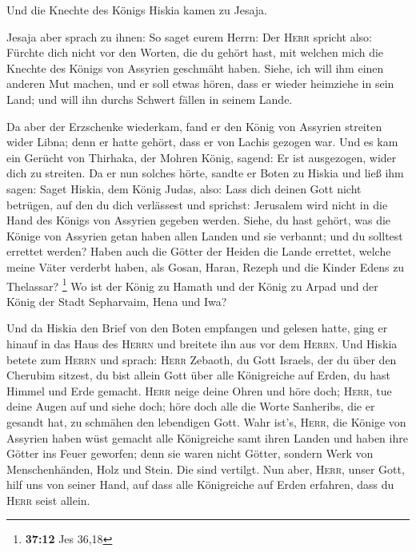  Und die Knechte des Königs Hiskia kamen zu Jesaja.

 Jesaja aber sprach zu ihnen: So saget eurem Herrn: Der
\textsc{Herr} spricht also: Fürchte dich nicht vor den Worten, die du
gehört hast, mit welchen mich die Knechte des Königs von Assyrien
geschmäht haben.  Siehe, ich will ihm einen anderen Mut
machen, und er soll etwas hören, dass er wieder heimziehe in sein Land;
und will ihn durchs Schwert fällen in seinem Lande.

 Da aber der Erzschenke wiederkam, fand er den König von
Assyrien streiten wider Libna; denn er hatte gehört, dass er von Lachis
gezogen war.  Und es kam ein Gerücht von Thirhaka, der
Mohren König, sagend: Er ist ausgezogen, wider dich zu streiten.
 Da er nun solches hörte, sandte er Boten zu Hiskia und
ließ ihm sagen: Saget Hiskia, dem König Judas, also: Lass dich deinen
Gott nicht betrügen, auf den du dich verlässest und sprichst: Jerusalem
wird nicht in die Hand des Königs von Assyrien gegeben werden.
 Siehe, du hast gehört, was die Könige von Assyrien getan
haben allen Landen und sie verbannt; und du solltest errettet werden?
 Haben auch die Götter der Heiden die Lande errettet,
welche meine Väter verderbt haben, als Gosan, Haran, Rezeph und die
Kinder Edens zu Thelassar? \footnote{\textbf{37:12} Jes 36,18}
 Wo ist der König zu Hamath und der König zu Arpad und
der König der Stadt Sepharvaim, Hena und Iwa?

 Und da Hiskia den Brief von den Boten empfangen und
gelesen hatte, ging er hinauf in das Haus des \textsc{Herrn} und
breitete ihn aus vor dem \textsc{Herrn}.  Und Hiskia
betete zum \textsc{Herrn} und sprach:  \textsc{Herr}
Zebaoth, du Gott Israels, der du über den Cherubim sitzest, du bist
allein Gott über alle Königreiche auf Erden, du hast Himmel und Erde
gemacht.  \textsc{Herr} neige deine Ohren und höre doch;
\textsc{Herr}, tue deine Augen auf und siehe doch; höre doch alle die
Worte Sanheribs, die er gesandt hat, zu schmähen den lebendigen Gott.
 Wahr ist's, \textsc{Herr}, die Könige von Assyrien haben
wüst gemacht alle Königreiche samt ihren Landen  und
haben ihre Götter ins Feuer geworfen; denn sie waren nicht Götter,
sondern Werk von Menschenhänden, Holz und Stein. Die sind vertilgt.
 Nun aber, \textsc{Herr}, unser Gott, hilf uns von seiner
Hand, auf dass alle Königreiche auf Erden erfahren, dass du
\textsc{Herr} seist allein.

